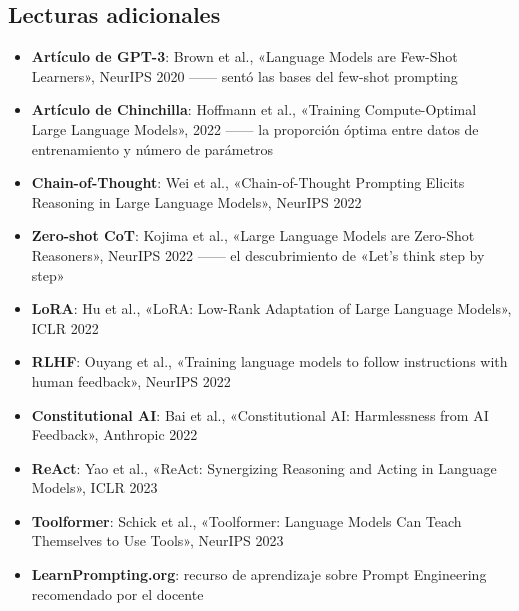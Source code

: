 \subsection{Lecturas adicionales}

\begin{itemize}
    \item \textbf{Artículo de GPT-3}: Brown et al., «Language Models are Few-Shot Learners», NeurIPS 2020 —— sentó las bases del few-shot prompting
    \item \textbf{Artículo de Chinchilla}: Hoffmann et al., «Training Compute-Optimal Large Language Models», 2022 —— la proporción óptima entre datos de entrenamiento y número de parámetros
    \item \textbf{Chain-of-Thought}: Wei et al., «Chain-of-Thought Prompting Elicits Reasoning in Large Language Models», NeurIPS 2022
    \item \textbf{Zero-shot CoT}: Kojima et al., «Large Language Models are Zero-Shot Reasoners», NeurIPS 2022 —— el descubrimiento de «Let's think step by step»
    \item \textbf{LoRA}: Hu et al., «LoRA: Low-Rank Adaptation of Large Language Models», ICLR 2022
    \item \textbf{RLHF}: Ouyang et al., «Training language models to follow instructions with human feedback», NeurIPS 2022
    \item \textbf{Constitutional AI}: Bai et al., «Constitutional AI: Harmlessness from AI Feedback», Anthropic 2022
    \item \textbf{ReAct}: Yao et al., «ReAct: Synergizing Reasoning and Acting in Language Models», ICLR 2023
    \item \textbf{Toolformer}: Schick et al., «Toolformer: Language Models Can Teach Themselves to Use Tools», NeurIPS 2023
    \item \textbf{LearnPrompting.org}: recurso de aprendizaje sobre Prompt Engineering recomendado por el docente
\end{itemize}



